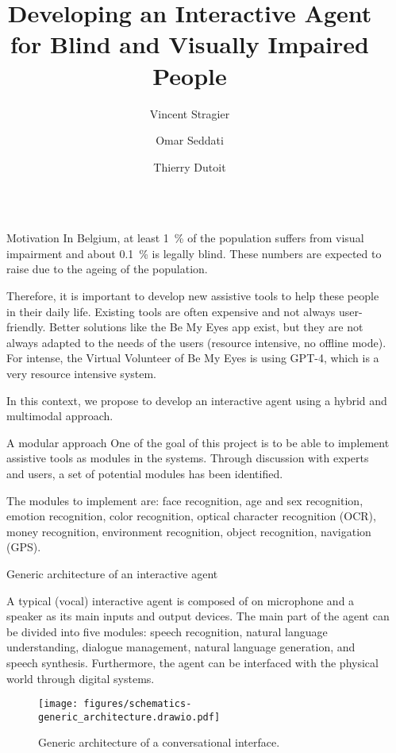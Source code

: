 \documentclass[final]{beamer}
\title{Developing an Interactive Agent for Blind and Visually Impaired People}
\author{Vincent Stragier \inst{1} \and Omar Seddati \inst{1} \and Thierry Dutoit \inst{1}}
\institute[shortinst]{\inst{1} Numediart Institute, ISIA Lab, Faculty of Engineering — University of Mons — Boulevard Dolez 31, 7000 Mons, Hainaut, Belgium}
\newlength{\sepwidth}
\newlength{\colwidth}
\newcommand{\separatorcolumn}{\begin{column}{\sepwidth}\end{column}}
\begin{document}
\begin{frame}[t]
  \begin{columns}[t]
    \separatorcolumn

    \begin{column}{\colwidth}

      \begin{block}{Motivation}
        In Belgium, at least 1~\% of the population suffers from visual impairment and about 0.1~\% is legally blind\cite{CeciteDeficienceVisuelle2023, naczykEqla2020}. These numbers are expected to raise due to the ageing of the population.

        Therefore, it is important to develop new assistive tools to help these people in their daily life. Existing tools are often expensive and not always user-friendly. Better solutions like the Be My Eyes\cite{IntroducingOurVirtual2023} app exist, but they are not always adapted to the needs of the users (resource intensive, no offline mode). For intense, the Virtual Volunteer of Be My Eyes is using GPT-4\cite{GPT42023}, which is a very resource intensive system.

        In this context, we propose to develop an interactive agent using a hybrid and multimodal approach.
      \end{block}

      \begin{block}{A modular approach}
        One of the goal of this project is to be able to implement assistive tools as modules in the systems. Through discussion with experts and users, a set of potential modules has been identified.

        The modules to implement are: face recognition, age and sex recognition, emotion recognition, color recognition, optical character recognition (OCR), money recognition, environment recognition, object recognition, navigation (GPS).
      \end{block}

      \begin{alertblock}{Generic architecture of an interactive agent}

        A typical (vocal) interactive agent is composed of on microphone and a speaker as its main inputs and output devices. The main part of the agent can be divided into five modules: speech recognition, natural language understanding, dialogue management, natural language generation, and speech synthesis. Furthermore, the agent can be interfaced with the physical world through digital systems.
        \begin{figure}[ht]
          \centering
          \texttt{[image: figures/schematics-generic\_architecture.drawio.pdf]}
          \caption{Generic architecture of a conversational interface\cite{lugrinHandbookSociallyInteractive2021}.\label{fig:architecture_conversational_interface}}
        \end{figure}


\end{alertblock}
\end{column}
\end{columns}
\end{frame}
\end{document}
